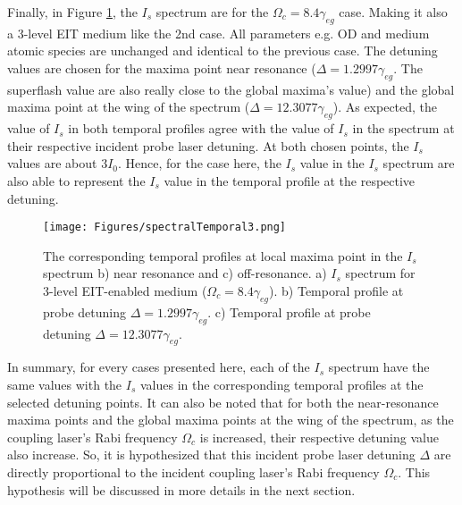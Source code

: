 Finally, in Figure \ref{fig: corresponding temporal profile 3}, the $I_{s}$ spectrum are for the $\Omega_{c} = 8.4\gamma_{eg}$ case. Making it also a 3-level EIT medium like the 2nd case. All parameters e.g. OD and medium atomic species are unchanged and identical to the previous case. The detuning values are chosen for the maxima point near resonance ($\Delta = 1.2997\gamma_{eg}$. The superflash value are also really close to the global maxima's value) and the global maxima point at the wing of the spectrum ($\Delta = 12.3077\gamma_{eg}$). As expected, the value of $I_{s}$ in both temporal profiles agree with the value of $I_{s}$ in the spectrum at their respective incident probe laser detuning. At both chosen points, the $I_{s}$ values are about $3I_{0}$. Hence, for the case here, the $I_{s}$ value in the $I_{s}$ spectrum are also able to represent the $I_{s}$ value in the temporal profile at the respective detuning.

\begin{figure}
    \centering
    \texttt{[image: Figures/spectralTemporal3.png]}
    \caption[Plots of Transmitted Intensity Temporal Profile At Their Corresponding Detuning in The $I_{s}$ Spectrum For $\Omega_{c} = 8.4\gamma_{eg}$]{The corresponding temporal profiles at local maxima point in the $I_{s}$ spectrum b) near resonance and c) off-resonance. a) $I_{s}$ spectrum for 3-level EIT-enabled medium ($\Omega_{c} = 8.4\gamma_{eg}$). b) Temporal profile at probe detuning $\Delta = 1.2997\gamma_{eg}$. c) Temporal profile at probe detuning $\Delta = 12.3077\gamma_{eg}$.}
    \label{fig: corresponding temporal profile 3}
\end{figure}

In summary, for every cases presented here, each of the $I_{s}$ spectrum have the same values with the $I_{s}$ values in the corresponding temporal profiles at the selected detuning points. It can also be noted that for both the near-resonance maxima points and the global maxima points at the wing of the spectrum, as the coupling laser's Rabi frequency $\Omega_{c}$ is increased, their respective detuning value also increase. So, it is hypothesized that this incident probe laser detuning $\Delta$ are directly proportional to the incident coupling laser's Rabi frequency $\Omega_{c}$. This hypothesis will be discussed in more details in the next section.


